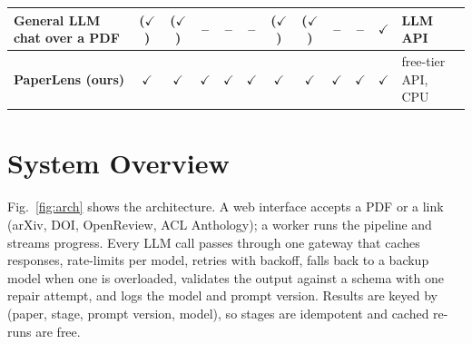 \documentclass[conference]{IEEEtran}
\newcommand{\yes}{$\checkmark$}
\newcommand{\no}{--}
\newcommand{\part}{($\checkmark$)}
\begin{document}
\begin{table}[t]
{\begin{tabular}{@{}lccccccccccl@{}}
General LLM chat over a PDF & \part & \part & \no & \no & \no & \part & \part & \no & \no & \yes & LLM API \\
\midrule
\textbf{PaperLens (ours)} & \yes & \yes & \yes & \yes & \yes & \yes & \yes & \yes & \yes & \yes & free-tier API, CPU \\
\bottomrule
\end{tabular}}
\end{table}

\section{System Overview}

Fig.~\ref{fig:arch} shows the architecture. A web interface accepts a PDF or a link (arXiv,
DOI, OpenReview, ACL Anthology); a worker runs the pipeline and streams progress. Every LLM
call passes through one gateway that caches responses, rate-limits per model, retries with
backoff, falls back to a backup model when one is overloaded, validates the output against a
schema with one repair attempt, and logs the model and prompt version. Results are keyed by
(paper, stage, prompt version, model), so stages are idempotent and cached re-runs are free.
\end{document}
